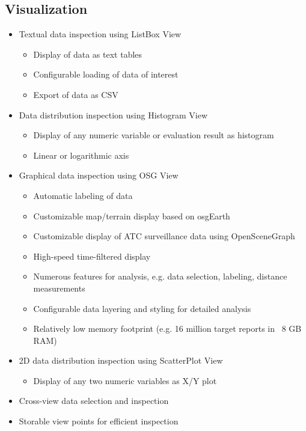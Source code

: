 \subsection{Visualization}
\begin{itemize}  
    \item Textual data inspection using ListBox View
    \begin{itemize}  
        \item Display of data as text tables
        \item Configurable loading of data of interest
        \item Export of data as CSV
    \end{itemize}
    \item Data distribution inspection using Histogram View
    \begin{itemize}  
        \item Display of any numeric variable or evaluation result as histogram
        \item Linear or logarithmic axis
    \end{itemize}
    \item Graphical data inspection using OSG View
    \begin{itemize}  
        \item Automatic labeling of data
        \item Customizable map/terrain display based on osgEarth
        \item Customizable display of ATC surveillance data using OpenSceneGraph
        \item High-speed time-filtered display
        \item Numerous features for analysis, e.g. data selection, labeling, distance measurements
        \item Configurable data layering and styling for detailed analysis
        \item Relatively low memory footprint (e.g. 16 million target reports in ~8 GB RAM)
    \end{itemize}    
    \item 2D data distribution inspection using ScatterPlot View
    \begin{itemize}  
        \item Display of any two numeric variables as X/Y plot
    \end{itemize}
    \item Cross-view data selection and inspection
    \item Storable view points for efficient inspection
\end{itemize}

